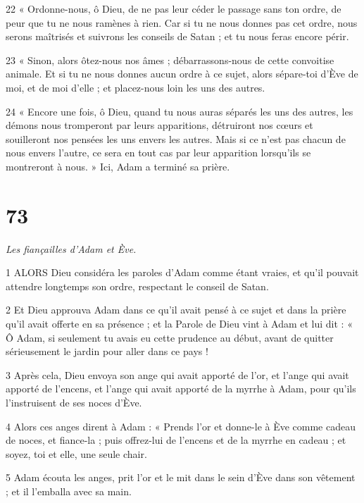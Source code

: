 \par 22 « Ordonne-nous, ô Dieu, de ne pas leur céder le passage sans ton ordre, de peur que tu ne nous ramènes à rien. Car si tu ne nous donnes pas cet ordre, nous serons maîtrisés et suivrons les conseils de Satan ; et tu nous feras encore périr.

\par 23 « Sinon, alors ôtez-nous nos âmes ; débarrassons-nous de cette convoitise animale. Et si tu ne nous donnes aucun ordre à ce sujet, alors sépare-toi d'Ève de moi, et de moi d'elle ; et placez-nous loin les uns des autres.

\par 24 « Encore une fois, ô Dieu, quand tu nous auras séparés les uns des autres, les démons nous tromperont par leurs apparitions, détruiront nos cœurs et souilleront nos pensées les uns envers les autres. Mais si ce n’est pas chacun de nous envers l’autre, ce sera en tout cas par leur apparition lorsqu’ils se montreront à nous. » Ici, Adam a terminé sa prière.

\chapter{73}

\par \textit{Les fiançailles d'Adam et Ève.}

\par 1 ALORS Dieu considéra les paroles d'Adam comme étant vraies, et qu'il pouvait attendre longtemps son ordre, respectant le conseil de Satan.

\par 2 Et Dieu approuva Adam dans ce qu'il avait pensé à ce sujet et dans la prière qu'il avait offerte en sa présence ; et la Parole de Dieu vint à Adam et lui dit : « Ô Adam, si seulement tu avais eu cette prudence au début, avant de quitter sérieusement le jardin pour aller dans ce pays !

\par 3 Après cela, Dieu envoya son ange qui avait apporté de l'or, et l'ange qui avait apporté de l'encens, et l'ange qui avait apporté de la myrrhe à Adam, pour qu'ils l'instruisent de ses noces d'Ève.

\par 4 Alors ces anges dirent à Adam : « Prends l'or et donne-le à Ève comme cadeau de noces, et fiance-la ; puis offrez-lui de l'encens et de la myrrhe en cadeau ; et soyez, toi et elle, une seule chair.

\par 5 Adam écouta les anges, prit l'or et le mit dans le sein d'Ève dans son vêtement ; et il l'emballa avec sa main.

